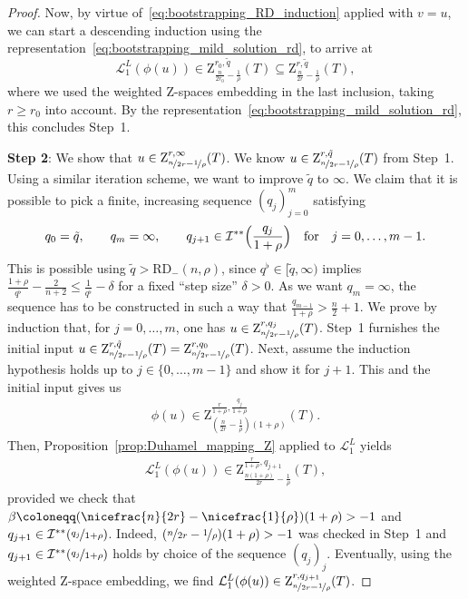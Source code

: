 \documentclass[11pt, leqno]{amsart}
\theoremstyle{definition}
\newcommand{\Z}{\mathrm{Z}}
\newcommand{\Soll}{\mathcal{L}}
\newcommand{\RD}{\mathrm{RD}}
\newcommand{\SobSet}{\mathcal{I}}
\begin{document}
\begin{proof}
		Now, {by virtue of~\eqref{eq:bootstrapping_RD_induction} applied with $v= u$,} we can start a descending induction using the representation~\eqref{eq:bootstrapping_mild_solution_rd}, to arrive at
		$$\Soll^L_1(\phi(u)) \in \Z^{r_0, \tilde q}_{\frac{n}{2r_0} - \frac{1}{\rho}}(T) \subseteq \Z^{r, \tilde q}_{\frac{n}{2r} - \frac{1}{\rho}}(T),$$
		where we used the weighted $\Z$-spaces embedding in the last inclusion, taking $r \geq r_0$ into account.
		By the representation~\eqref{eq:bootstrapping_mild_solution_rd}, this concludes Step~1.

		\textbf{Step 2}: We
		show that $u \in \Z^{r,\infty}_{\nicefrac{n}{2r} - \nicefrac{1}{\rho}}(T)$.
		{We know $u \in \Z^{r, \tilde q}_{\nicefrac{n}{2r} - \nicefrac{1}{\rho}}(T)$ from Step~1.}
		Using a similar iteration scheme, we want to improve $\tilde q$ to $\infty$. We claim that it is possible to pick a finite, increasing sequence $(q_j)_{j=0}^m$ satisfying
		\begin{align}
			q_0 = \tilde q, \qquad q_m = \infty, \qquad
			q_{j+1} \in \SobSet^{**}\Bigl(\frac{q_j}{1+\rho}\Bigr)
			\quad \text{for} \quad j = 0, \dots, m-1.
		\end{align}
		This is possible using $\tilde q >\RD_{-}(n, \rho)$, since $ q^\flat \in [\tilde q,\infty)$ implies $\tfrac{1+\rho}{q^\flat} - \tfrac{2}{n+2} \leq \tfrac{1}{q^\flat} - \delta$ for a fixed \enquote{step size} $\delta > 0$.
		As we want $q_m = \infty$, the sequence has to be constructed in such a way that $\tfrac{q_{m-1}} {1+\rho} >\tfrac{n}{2} + 1$.
		We prove by induction
		that, for $j = 0,\dots, m$, one has
		$u\in \Z^{r, q_j}_{\nicefrac{n}{2r} - \nicefrac{1}{\rho}}(T)$.
		Step~1 furnishes the initial input $u \in \Z^{r, \tilde q}_{\nicefrac{n}{2r} - \nicefrac{1}{\rho}}(T) = \Z^{r, q_0}_{\nicefrac{n}{2r} - \nicefrac{1}{\rho}}(T)$.
		Next, assume the induction hypothesis holds up to $j\in \{0, \ldots, m-1\}$ and show it for $j+1$. %
		This and the initial input gives us
		\begin{align}
			\label{eq:phi_induction}
			\phi(u) \in \Z^{\frac{r}{1+\rho}, \frac{q_j}{1+\rho}}_{(\frac{n}{2r} - \frac{1}{\rho})(1+\rho)}(T).
		\end{align}
		Then, Proposition~\ref{prop:Duhamel_mapping_Z} applied to $\Soll^L_1$ yields
		\begin{align}
			\label{eq:bootstrapping_RD_step2}
			\Soll^L_1(\phi(u)) \in \Z^{\frac{r}{1+\rho}, q_{j+1}}_{\frac{n(1+\rho)}{2r} - \frac{1}{\rho}}(T),
		\end{align}
		provided we
	check that $\beta \coloneqq (\nicefrac{n}{2r} - \nicefrac{1}{\rho})(1+\rho) > -1$ and $q_{j+1} \in \SobSet^{**}(\nicefrac{q_j}{1+\rho})$.
	Indeed, $(\nicefrac{n}{2r} - \nicefrac{1}{\rho})(1+\rho) > -1$ was checked in Step~1 and
	$q_{j+1} \in \SobSet^{**}(\nicefrac{q_j}{1+\rho})$
	holds by choice of the sequence $(q_j)_j$.
	Eventually, using the weighted $\Z$-space embedding, we find $\Soll^L_1(\phi(u)) \in \Z^{r, q_{j+1}}_{\nicefrac{n}{2r} - \nicefrac{1}{\rho}}(T)$.


\end{proof}
\end{document}
